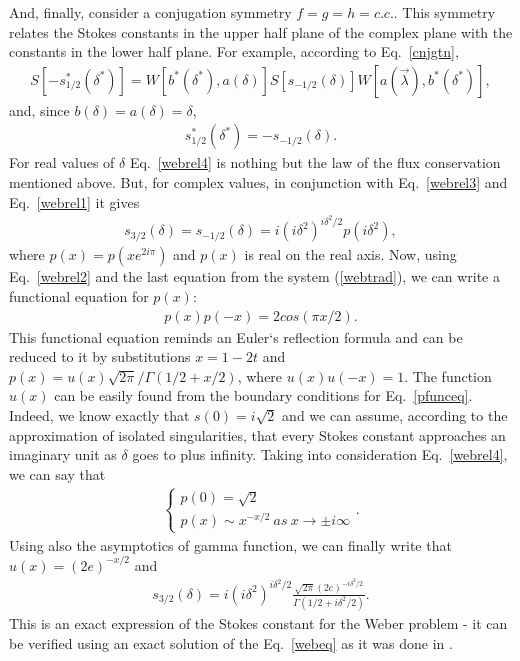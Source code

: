 \documentclass[aps,prl,preprint,superscriptaddress]{revtex4}
\begin{document}
And, finally, consider a conjugation symmetry $f=g=h=c.c.$. This symmetry relates the Stokes constants in the upper half plane of the complex plane with the constants in the lower half plane. For example, according to Eq.~\ref{cnjgtn},
\begin{eqnarray}
S[-s_{1/2}^*(\delta^*)] = W[b^*(\delta^*),a(\delta)]S[s_{-1/2}(\delta)]W[a(\vec{\lambda}),b^*(\delta^*)],
\label{webcs1}
\end{eqnarray}
and, since $b(\delta)=a(\delta)=\delta$,
\begin{eqnarray}
s_{1/2}^*(\delta^*)=-s_{-1/2}(\delta).
\label{webrel4}
\end{eqnarray}
For real values of $\delta$ Eq.~\ref{webrel4} is nothing but the law of the flux conservation mentioned above. But, for complex values, in conjunction with Eq.~\ref{webrel3} and Eq.~\ref{webrel1} it gives
\begin{eqnarray}
s_{3/2}(\delta)=s_{-1/2}(\delta)=i(i\delta^2)^{i\delta^2/2}p(i\delta^2),
\label{webrel4}
\end{eqnarray}
where $p(x)=p(x e^{2i\pi})$ and $p(x)$ is real on the real axis. Now, using Eq.~\ref{webrel2} and the last equation from the 
system (\ref{webtrad}), we can write a functional equation for $p(x)$:
\begin{eqnarray}
p(x)p(-x)=2cos(\pi x/2).
\label{pfunceq}
\end{eqnarray}
This functional equation reminds an Euler`s reflection formula and can be reduced to it by substitutions
$x=1-2t$ and $p(x)=u(x)\sqrt{2\pi}/\Gamma(1/2+x/2)$, where $u(x)u(-x)=1$. The function $u(x)$ can be easily found from the boundary conditions for Eq.~\ref{pfunceq}. Indeed, we know exactly \cite{white} that $s(0)=i\sqrt{2}$ and we can assume, according to the approximation of isolated singularities, that every Stokes constant approaches an imaginary unit as $\delta$ goes to plus infinity. Taking into consideration Eq.~\ref{webrel4}, we can say that
\begin{eqnarray}
\begin{cases} 
p(0) = \sqrt{2}\\
p(x) \sim x^{-x/2}\ as\ x \rightarrow \pm i \infty 
\end{cases}.
\label{pbnds}  
\end{eqnarray}
Using also the asymptotics of gamma function, we can finally write that $u(x)=(2e)^{-x/2}$ and
\begin{eqnarray}
s_{3/2}(\delta)=i(i\delta^2)^{i\delta^2/2}\frac{\sqrt{2\pi}(2e)^{-i\delta^2/2}}{\Gamma(1/2+i\delta^2/2)}.
\label{webfinal}  
\end{eqnarray}
This is an exact expression of the Stokes constant for the Weber problem - it can be verified using an exact solution 
of the Eq.~\ref{webeq} as it was done in \cite{ours}.
    
\end{document}
